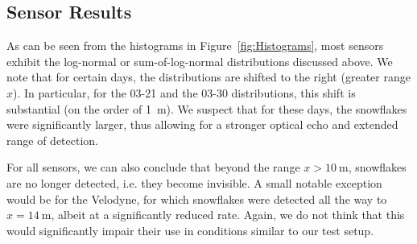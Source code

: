 \subsection{Sensor Results}
As can be seen from the histograms in Figure~\ref{fig:Histograms}, most sensors exhibit the log-normal or sum-of-log-normal distributions discussed above. We note that for certain days, the distributions are shifted to the right (greater range $x$). In particular, for the 03-21 and the 03-30 distributions, this shift is substantial (on the order of \SI{1}{\meter}). We suspect that for these days, the snowflakes were significantly larger, thus allowing for a stronger optical echo and extended range of detection.

For all sensors, we can also conclude that beyond the range $x>\SI{10}{\meter}$, snowflakes are no longer detected, i.e. they become invisible. A small notable exception would be for the Velodyne, for which snowflakes were detected all the way to $x=\SI{14}{\meter}$, albeit at a significantly reduced rate. Again, we do not think that this would significantly impair their use in conditions similar to our test setup.


